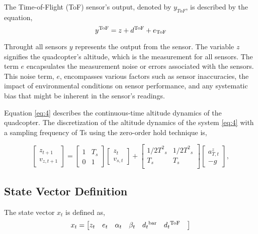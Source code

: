 \documentclass{article}
\begin{document}
The Time-of-Flight (ToF) sensor's output, denoted by \( y_{ToF} \), is described by the equation,
\begin{equation}
y^{\rm ToF} = z + d^{\rm ToF} + e_{\rm ToF}
\end{equation}


Throught all sensors \( y \) represents the output from the sensor. The variable \( z \) signifies the quadcopter's altitude, which is the measurement for all sensors. The term \( e \) encapsulates the measurement noise or errors associated with the sensors. This noise term, \( e \), encompasses various factors such as sensor inaccuracies, the impact of environmental conditions on sensor performance, and any systematic bias that might be inherent in the sensor's readings.

Equation \eqref{eq:4} describes the continuous-time altitude dynamics of the quadcopter. 
The discretization of the altitude dynamics of the system \eqref{eq:4} with a sampling frequency of Ts using the zero-order hold technique is,

\begin{equation}
    \begin{bmatrix}
    z_{t+1}\\
    v_{z,t+1}
    \end{bmatrix} =
    \begin{bmatrix}
    1 & T_s \\
    0 & 1 
    \end{bmatrix}
    \begin{bmatrix}
    z_t\\
    v_{s,t}
    \end{bmatrix} + 
    \begin{bmatrix}
    {1/2}{T^2}_s & {1/2}{T^2}_s \\
    T_s & T_s \\ 
    \end{bmatrix}
    \begin{bmatrix}
    a_{T,t}^z \\ 
    -g
    \end{bmatrix},
\end{equation}
\subsection{State Vector Definition}
The state vector \( x_t \) is defined as,
\begin{equation}
    x_t = 
    \begin{bmatrix}
        z_t &
        e_{t} & 
        \alpha_t & 
        \beta_t &
        d{_t}^{\rm bar}&
        d{_t}^{\rm ToF}&
    \end{bmatrix}
\end{equation}
\end{document}
